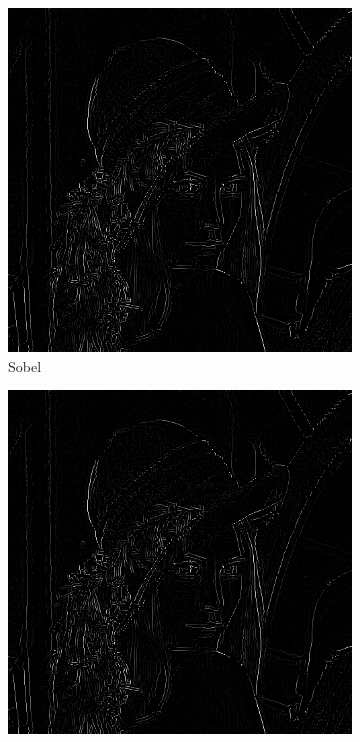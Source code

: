 \documentclass[a4paper]{article}
\begin{document}
\begin{figure}[H]
\centering
	\begin{subfigure}[t]{0.3\textwidth}
	\centering
	\includegraphics[width=\textwidth]{imagenesInforme/lenaNonMaximumSupressionSobel}
	\caption{Sobel}
	\end{subfigure}
	\begin{subfigure}[t]{0.3\textwidth}
	\centering
	\includegraphics[width=\textwidth]{imagenesInforme/lenaNonMaximumSupressionPrewitt}

\end{subfigure}
\end{figure}
\end{document}
